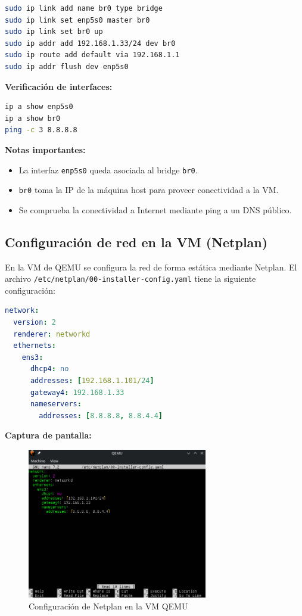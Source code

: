 \documentclass[12pt, a4paper]{article}
\begin{document}
\begin{lstlisting}[language=bash, caption=Creación del bridge br0]
sudo ip link add name br0 type bridge
sudo ip link set enp5s0 master br0
sudo ip link set br0 up
sudo ip addr add 192.168.1.33/24 dev br0
sudo ip route add default via 192.168.1.1
sudo ip addr flush dev enp5s0
\end{lstlisting}

\textbf{Verificación de interfaces:}

\begin{lstlisting}[language=bash, caption=Verificación de interfaces]
ip a show enp5s0
ip a show br0
ping -c 3 8.8.8.8
\end{lstlisting}

\textbf{Notas importantes:}
\begin{itemize}
    \item La interfaz \texttt{enp5s0} queda asociada al bridge \texttt{br0}.
    \item \texttt{br0} toma la IP de la máquina host para proveer conectividad a la VM.
    \item Se comprueba la conectividad a Internet mediante ping a un DNS público.
\end{itemize}
\newpage
\subsection{Configuración de red en la VM (Netplan)}

En la VM de QEMU se configura la red de forma estática mediante Netplan. El archivo \texttt{/etc/netplan/00-installer-config.yaml} tiene la siguiente configuración:

\begin{lstlisting}[language=yaml, caption=Archivo de Netplan de la VM QEMU]
network:
  version: 2
  renderer: networkd
  ethernets:
    ens3:
      dhcp4: no
      addresses: [192.168.1.101/24]
      gateway4: 192.168.1.33
      nameservers:
        addresses: [8.8.8.8, 8.8.4.4]
\end{lstlisting}

\textbf{Captura de pantalla:}  

\begin{figure}[H]
    \centering
    \includegraphics[width=0.7\textwidth]{1.png}
    \caption{Configuración de Netplan en la VM QEMU}
    \label{fig:netplan_vm}
\end{figure}
\newpage
\end{document}
